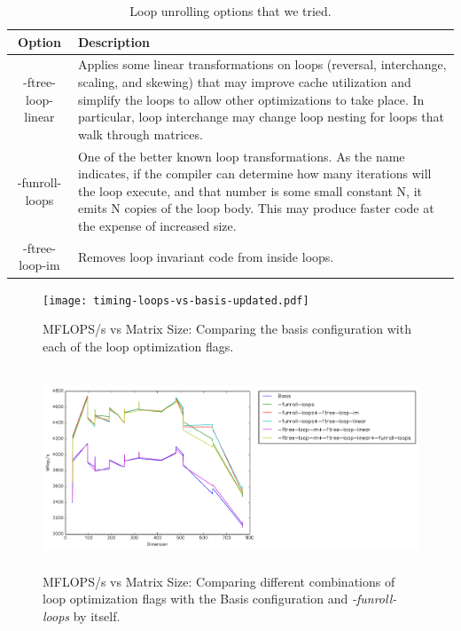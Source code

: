 \documentclass{article}
\begin{document}
\begin{table}
\begin{center}
    \begin{tabular}{ | c | p{10cm} |}
    \hline
    Option & Description \\ \hline
    -ftree-loop-linear  & Applies some linear transformations on loops (reversal, interchange, scaling, and skewing) that may improve cache utilization and simplify the loops to allow other optimizations to take place. In particular, loop interchange may change loop nesting for loops that walk through matrices. \\ \hline
    -funroll-loops &  One of the better known loop transformations. As the name indicates, if the compiler can determine how many iterations will the loop execute, and that number is some small constant N, it emits N copies of the loop body. This may produce faster code at the expense of increased size. \\
    \hline
    -ftree-loop-im & Removes loop invariant code from inside loops. \\ \hline
    \end{tabular}
    \caption{Loop unrolling options that we tried.}
    \label{loop-unrolling}
\end{center}
\end{table}

  \begin{figure}[h]
    \centering
    \texttt{[image: timing-loops-vs-basis-updated.pdf]}
    \caption{MFLOPS/s vs Matrix Size: Comparing the basis configuration with each of the loop optimization flags.}
    \label{fig:timing-loops1}
  \end{figure}
  
    \begin{figure}[h]
    \centering
    \includegraphics[width=14cm,height=6cm]{timing-loopunroll-vs-combos.pdf}
    \caption{MFLOPS/s vs Matrix Size: Comparing different combinations of loop optimization flags with the Basis configuration and \textit{-funroll-loops} by itself.}
    \label{fig:timing-loops2}
  \end{figure}
\end{document}
